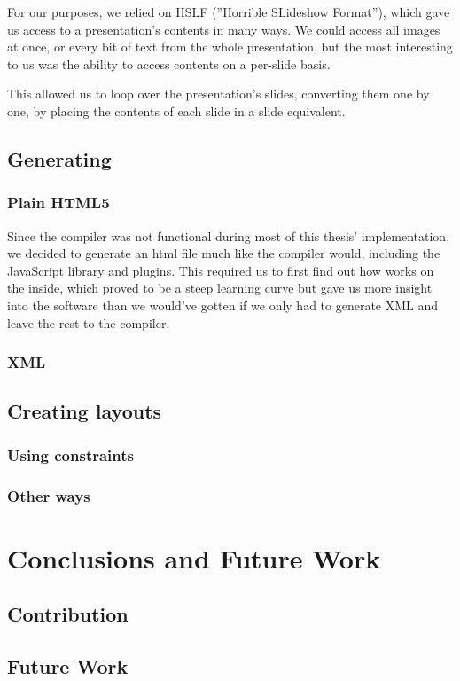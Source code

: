 \documentclass[a4paper,12pt]{report}
\begin{document}
   For our purposes, we relied on HSLF (''Horrible SLideshow Format''), which
   gave us access to a \ppt presentation's contents in many ways. We could
   access all images at once, or every bit of text from the whole presentation,
   but the most interesting to us was the ability to access contents on a
   per-slide basis.

   This allowed us to loop over the presentation's slides, converting them one
   by one, by placing the contents of each slide in a \mxp slide equivalent.

  \section{Generating \mxp}

   \subsection{Plain HTML5}

    Since the \mxp compiler was not functional during most of this thesis'
    implementation, we decided to generate an html file much like the \mxp
    compiler would, including the \mxp JavaScript library and plugins. This
    required us to first find out how \mxp works on the inside, which proved to
    be a steep learning curve but gave us more insight into the software than
    we would've gotten if we only had to generate \mxp XML and leave the rest
    to the compiler.

   \subsection{\mxp XML}

  \section{Creating layouts}

   \subsection{Using constraints}

   \subsection{Other ways}

 \chapter{Conclusions and Future Work}

  \section{Contribution}

  \section{Future Work}

 \newpage

 
 
\end{document}

